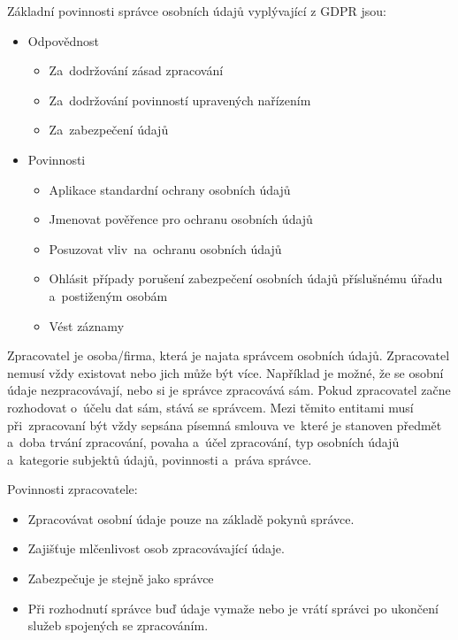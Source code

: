Základní povinnosti správce osobních údajů vyplývající z GDPR jsou:

\begin{itemize}
    \item Odpovědnost
    \begin{itemize}
        \item Za~dodržování zásad zpracování
        \item Za~dodržování povinností upravených nařízením
        \item Za~zabezpečení údajů
    \end{itemize}
    \item Povinnosti
    \begin{itemize}
        \item Aplikace standardní ochrany osobních údajů
        \item Jmenovat pověřence pro ochranu osobních údajů
        \item Posuzovat vliv~na~ochranu osobních údajů
        \item Ohlásit případy porušení zabezpečení osobních údajů příslušnému úřadu a~postiženým osobám
        \item Vést záznamy
    \end{itemize}
\end{itemize}

Zpracovatel je osoba/firma, která je najata správcem osobních údajů. Zpracovatel nemusí vždy existovat nebo jich může být více. Například je možné, že se osobní údaje nezpracovávají, nebo si je správce zpracovává sám. Pokud zpracovatel začne rozhodovat o~účelu dat sám, stává se správcem. Mezi těmito entitami musí při~zpracovaní být vždy sepsána písemná smlouva ve~které je stanoven předmět a~doba trvání zpracování, povaha a~účel zpracování, typ osobních údajů a~kategorie subjektů údajů, povinnosti a~práva správce.

Povinnosti zpracovatele:

\begin{itemize}
    \item Zpracovávat osobní údaje pouze na základě pokynů správce.
    \item Zajišťuje mlčenlivost osob zpracovávající údaje.
    \item Zabezpečuje je stejně jako správce
    \item Při rozhodnutí správce buď údaje vymaže nebo je vrátí správci po ukončení služeb spojených se zpracováním. 
\end{itemize}

